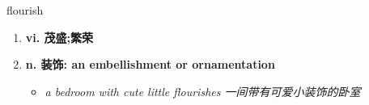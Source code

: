 
\begin{frame}
{\huge flourish}
\begin{center}
\begin{enumerate}\Large
  \item \textbf{vi. 茂盛;繁荣}
  \item \textbf{n. 装饰: an embellishment or ornamentation}
  \begin{itemize}
    \item \em{\Large{a bedroom with cute little flourishes 一间带有可爱小装饰的卧室}}
  \end{itemize}
\end{enumerate}
\end{center}
\end{frame}
